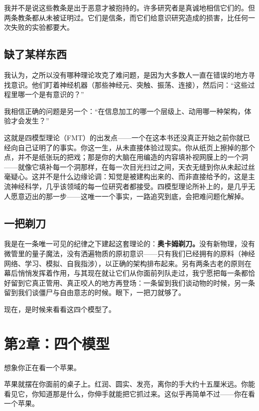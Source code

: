 \documentclass[11pt, twoside, openright]{book}
\begin{document}
我并不是说这些教条是出于恶意才被抱持的。许多研究者是真诚地相信它们的。但两条教条都从未被证明过。它们是信条，而它们给意识研究造成的损害，比任何一次失败的实验都要大。

\section*{缺了某样东西}

我认为，之所以没有哪种理论攻克了难问题，是因为大多数人一直在错误的地方寻找意识。他们盯着神经机器（那些神经元、突触、振荡、连接），然后问：“这些过程里哪一个是有意识的？”

我相信正确的问题是另一个：“在信息加工的哪一个层级上、动用哪一种架构，体验才会发生？”

这就是四模型理论（FMT）的出发点------一个在这本书还没真正开始之前你就已经向自己证明了的事实。你这一生，从未直接体验过现实。你从纸页上擦掉的那个点，并不是纸张玩的把戏；那是你的大脑在用编造的内容填补视网膜上的一个洞------就像它填补每一个洞那样，在每一次目光扫过之间，天衣无缝到你从未起过丝毫疑心。这并不是什么边缘论调：知觉是被建构出来的、而非直接给予的，这是主流神经科学，几乎该领域的每一位研究者都接受。四模型理论所补上的，是几乎无人愿意迈出的那一步------这唯一一个事实，一路追究到底，会把难问题化解掉。

\section*{一把剃刀}

我是在一条唯一可见的纪律之下建起这套理论的：\textbf{奥卡姆剃刀。}没有新物理，没有微管里的量子魔法，没有洒遍物质的原初意识------只有我们已经拥有的原料（神经网络、学习、模拟、自我指涉），以正确的架构排布起来。另有两条古老的原则在幕后悄悄发挥着作用，与其现在就让它们从你面前列队走过，我宁愿把每一条都恰好留到它真正管用、真正咬人的地方再登场：一条留到我们谈动物的时候，另一条留到我们谈僵尸与自由意志的时候。眼下，一把刀就够了。

现在，是时候来看看这四个模型了。


\chapter*{第2章：四个模型}

想象你正在看一个苹果。

苹果就摆在你面前的桌子上。红润、圆实、发亮，离你的手大约十五厘米远。你能看见它，你知道那是什么，你伸手就能把它抓过来。这似乎再简单不过------你在看一个苹果。
\end{document}
